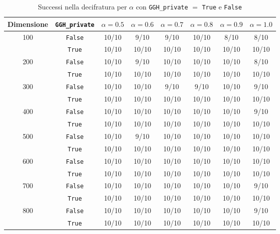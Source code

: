 \begin{table}[H]
    \centering
    \begin{tabular}{|c|c|c|c|c|c|c|c|}
    \hline
    Dimensione & \texttt{GGH\_private} & $\alpha=0.5$ & $\alpha=0.6$ & $\alpha=0.7$ & $\alpha=0.8$ & $\alpha=0.9$ & $\alpha=1.0$ \\
    \hline
    \multirow{2}{*}{100} & \texttt{False} & 10/10 & 9/10 & 9/10 & 10/10 & 8/10 & 8/10 \\
                         & \texttt{True}  & 10/10 & 10/10 & 10/10 & 10/10 & 10/10 & 10/10 \\
    \hline
    \multirow{2}{*}{200} & \texttt{False} & 10/10 & 9/10 & 10/10 & 10/10 & 10/10 & 8/10 \\
                         & \texttt{True}  & 10/10 & 10/10 & 10/10 & 10/10 & 10/10 & 10/10 \\
    \hline
    \multirow{2}{*}{300} & \texttt{False} & 10/10 & 10/10 & 9/10 & 9/10 & 10/10 & 9/10 \\
                         & \texttt{True}  & 10/10 & 10/10 & 10/10 & 10/10 & 10/10 & 10/10 \\
    \hline
    \multirow{2}{*}{400} & \texttt{False} & 10/10 & 10/10 & 10/10 & 10/10 & 10/10 & 9/10 \\
                         & \texttt{True}  & 10/10 & 10/10 & 10/10 & 10/10 & 10/10 & 10/10 \\
    \hline
    \multirow{2}{*}{500} & \texttt{False} & 10/10 & 9/10 & 10/10 & 10/10 & 10/10 & 10/10 \\
                         & \texttt{True}  & 10/10 & 10/10 & 10/10 & 10/10 & 10/10 & 10/10 \\
    \hline
    \multirow{2}{*}{600} & \texttt{False} & 10/10 & 10/10 & 10/10 & 10/10 & 10/10 & 10/10 \\
                         & \texttt{True}  & 10/10 & 10/10 & 10/10 & 10/10 & 10/10 & 10/10 \\
    \hline
    \multirow{2}{*}{700} & \texttt{False} & 10/10 & 10/10 & 10/10 & 10/10 & 10/10 & 9/10 \\
                         & \texttt{True}  & 10/10 & 10/10 & 10/10 & 10/10 & 10/10 & 10/10 \\
    \hline
    \multirow{2}{*}{800} & \texttt{False} & 10/10 & 10/10 & 10/10 & 10/10 & 10/10 & 9/10 \\
                         & \texttt{True}  & 10/10 & 10/10 & 10/10 & 10/10 & 10/10 & 10/10 \\
    \hline
    \end{tabular}
    \caption{Successi nella decifratura per $\alpha$ con 
    \texttt{GGH\_private} $=$ \texttt{True} e \texttt{False}}
    \label{tab:combined_successes_hnf}
\end{table}

